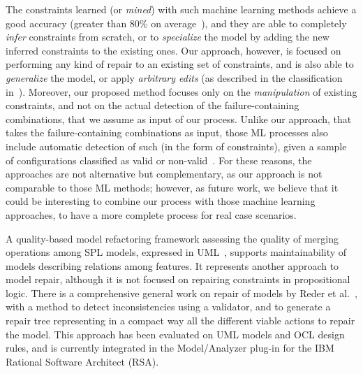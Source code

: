 \begin{tikzborder}{\cite{Gargantini16:validation}}
\begin{tikzborder}{\cite{gargantini_combinatorial_2017}}
\begin{tikzborder}{\cite{garn2019}}
\begin{tikzborder}{\cite{arcaini2019achieving}}
\begin{tikzborder}{\cite{arcaini2019varivolution}}
		The constraints learned (or \textit{mined}) with such machine learning methods achieve a good accuracy (greater than 80\% on average~\cite{temple_learning_2017}), and they are able to completely \textit{infer} constraints from scratch, or to \textit{specialize} the model by adding the new inferred constraints to the existing ones. Our approach, however, is focused on performing any kind of repair to an existing set of constraints, and is also able to \textit{generalize} the model, or apply \textit{arbitrary edits} (as described in the classification in~\cite{thum_reasoning_2009}). Moreover, our proposed method focuses only on the \textit{manipulation} of existing constraints, and not on the actual detection of the failure-containing combinations, that we assume as input of our process. Unlike our approach, that takes the failure-containing combinations as input, those ML processes also include automatic detection of such \fccs (in the form of constraints), given a sample of configurations classified as valid or non-valid~\cite{temple_learning_2017}. For these reasons, the approaches are not alternative but complementary, as our approach is not comparable to those ML methods; however, as future work, we believe that it could be interesting to combine our process with those machine learning approaches, to have a more complete process for real case scenarios.
		
		A quality-based model refactoring framework assessing the quality of merging operations among SPL models, expressed in UML~\cite{rubin_quality_2013}, supports maintainability of models describing relations among features. It represents another approach to model repair, although it is not focused on repairing constraints in propositional logic. There is a comprehensive general work on repair of models by Reder et al.~\cite{reder_computing_2012}, with a method to detect inconsistencies using a validator, and to generate a repair tree representing in a compact way all the different viable actions to repair the model. This approach has been evaluated on UML models and OCL design rules, and is currently integrated in the Model/Analyzer plug-in for the IBM Rational Software Architect (RSA). 
		\be
		

\end{tikzborder}
\end{tikzborder}
\end{tikzborder}
\end{tikzborder}
\end{tikzborder}
